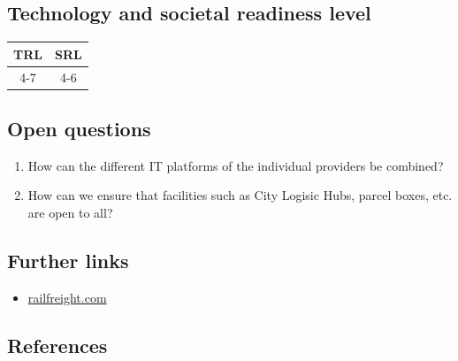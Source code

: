 \documentclass[
]{book}
\providecommand{\tightlist}{%
  \setlength{\itemsep}{0pt}\setlength{\parskip}{0pt}}
\begin{document}
\hypertarget{technology-and-societal-readiness-level-30}{%
\subsection*{Technology and societal readiness level}\label{technology-and-societal-readiness-level-30}}

\begin{longtable}[]{@{}cc@{}}
\toprule
TRL & SRL\tabularnewline
\midrule
\endhead
4-7 & 4-6\tabularnewline
\bottomrule
\end{longtable}

\hypertarget{open-questions-30}{%
\subsection*{Open questions}\label{open-questions-30}}

\begin{enumerate}
\def\labelenumi{\arabic{enumi}.}
\tightlist
\item
  How can the different IT platforms of the individual providers be combined?
\item
  How can we ensure that facilities such as City Logisic Hubs, parcel boxes, etc. are open to all?
\end{enumerate}

\hypertarget{further-links-27}{%
\subsection*{Further links}\label{further-links-27}}

\begin{itemize}
\tightlist
\item
  \href{https://www.railfreight.com/railfreight/2017/08/03/light-rail-network-used-for-freight-transport/?gdpr=accept}{railfreight.com}
\end{itemize}

\hypertarget{references-30}{%
\subsection*{References}\label{references-30}}
\end{document}
